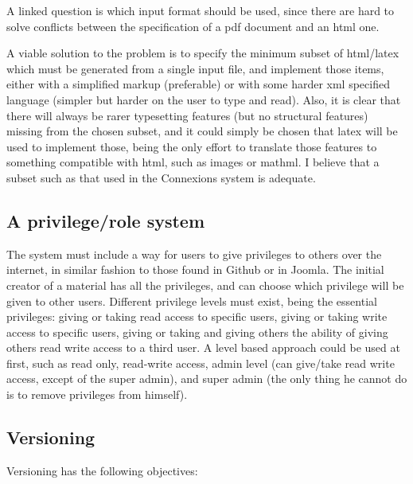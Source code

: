 \documentclass[12pt]{article}
\begin{document}
  A linked question is which input format should be used, since there are hard to solve conflicts between the specification of a pdf document and an html one.
  
  A viable solution to the problem is to specify the minimum subset of html/latex which must be generated from a single input file, and implement those items, either with a simplified markup (preferable) or with some harder xml specified language (simpler but harder on the user to type and read). Also, it is clear that there will always be rarer typesetting features (but no structural features) missing from the chosen subset, and it could simply be chosen that latex will be used to implement those, being the only effort to translate those features to something compatible with html, such as images or mathml. I believe that a subset such as that used in the Connexions \cite{Co12} system is adequate.

\subsection{A privilege/role system}

The system must include a way for users to give privileges to others over the internet, in similar fashion to those found in Github or in Joomla. The initial creator of a material has all the privileges, and can choose which privilege will be given to other users. Different privilege levels must exist, being the essential privileges: giving or taking read access to specific users, giving or taking write access to specific users, giving or taking and giving others the ability of giving others read write access to a third user. A level based approach could be used at first, such as read only, read-write access, admin level (can give/take read write access, except of the super admin), and super admin (the only thing he cannot do is to remove privileges from himself).
  
\subsection{Versioning}

Versioning has the following objectives:
\end{document}
